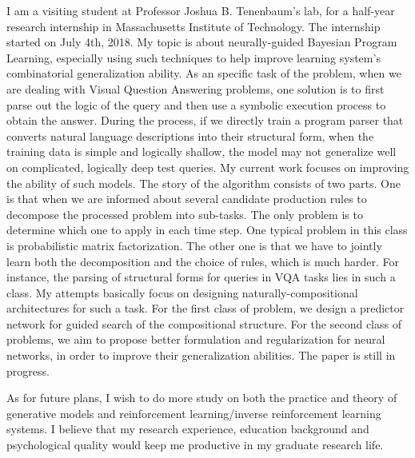 \documentclass{article}
\begin{document}
      I am a visiting student at Professor Joshua B. Tenenbaum's lab, for a half-year research internship in Massachusetts Institute of Technology. The internship started on July 4th, 2018. My topic is about neurally-guided Bayesian Program Learning, especially using such techniques to help improve learning system's combinatorial generalization ability. As an specific task of the problem, when we are dealing with Visual Question Answering problems, one solution is to first parse out the logic of the query and then use a symbolic execution process to obtain the answer. During the process, if we directly train a program parser that converts natural language descriptions into their structural form, when the training data is simple and logically shallow, the model may not generalize well on complicated, logically deep test queries. My current work focuses on improving the ability of such models. The story of the algorithm consists of two parts. One is that when we are informed about several candidate production rules to decompose the processed problem into sub-tasks. The only problem is to determine which one to apply in each time step. One typical problem in this class is probabilistic matrix factorization. The other one is that we have to jointly learn both the decomposition and the choice of rules, which is much harder. For instance, the parsing of structural forms for queries in VQA tasks lies in such a class. My attempts basically focus on designing naturally-compositional architectures for such a task. For the first class of problem, we design a predictor network for guided search of the compositional structure. For the second class of problems, we aim to propose better formulation and regularization for neural networks, in order to improve their generalization abilities. The paper is still in progress. 

      As for future plans, I wish to do more study on both the practice and theory of generative models and reinforcement learning/inverse reinforcement learning systems. I believe that my research experience, education background and psychological quality would keep me productive in my graduate research life.

    
\end{document}
